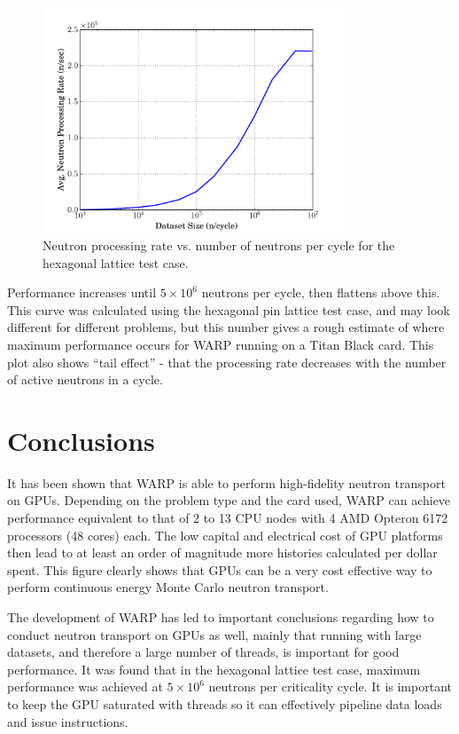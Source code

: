 \documentclass[preprint,12pt]{elsarticle}
\begin{document}
\begin{figure}[h!]
\centering
\includegraphics[width=0.8\textwidth,trim= 1cm 0cm 1cm 0cm]{graphics/scaling.pdf}
\caption{Neutron processing rate vs. number of neutrons per cycle for the hexagonal lattice test case. \label{scaling} }
\end{figure}

Performance increases until $5\times10^6$ neutrons per cycle, then flattens above this.  This curve was calculated using the hexagonal pin lattice test case, and may look different for different problems, but this number gives a rough estimate of where maximum performance occurs for WARP running on a Titan Black card.  This plot also shows ``tail effect'' - that the processing rate decreases with the number of active neutrons in a cycle.  

\newpage
\section{Conclusions}
\label{sec:conc}

It has been shown that WARP is able to perform high-fidelity neutron transport on GPUs.  Depending on the problem type and the card used, WARP can achieve performance equivalent to that of 2 to 13 CPU nodes with 4 AMD Opteron 6172 processors (48 cores) each.  The low capital and electrical cost of GPU platforms then lead to at least an order of magnitude more histories calculated per dollar spent.  This figure clearly shows that GPUs can be a very cost effective way to perform continuous energy Monte Carlo neutron transport.

The development of WARP has led to important conclusions regarding how to conduct neutron transport on GPUs as well, mainly that running with large datasets, and therefore a large number of threads, is important for good performance.  It was found that in the hexagonal lattice test case, maximum performance was achieved at $5\times10^6$ neutrons per criticality cycle.  It is important to keep the GPU saturated with threads so it can effectively pipeline data loads and issue instructions.  
\end{document}
